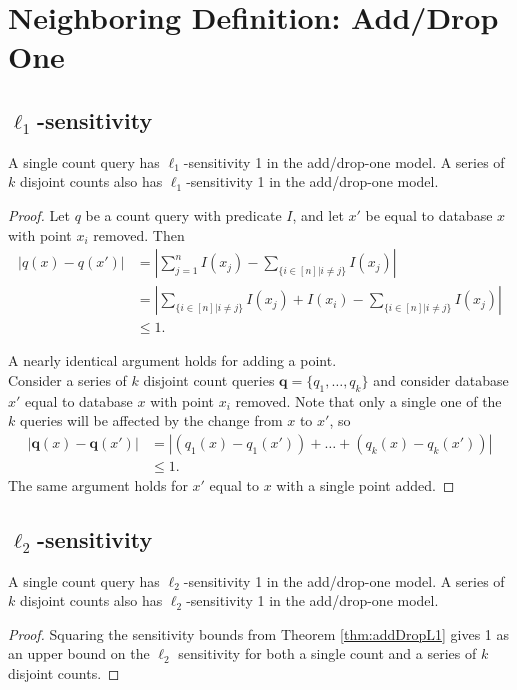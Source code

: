 \documentclass[11pt]{scrartcl} %
\begin{document}
\section{Neighboring Definition: Add/Drop One}
\subsection{$\ell_1$-sensitivity}
\begin{theorem}
\label{thm:addDropL1}
A single count query has $\ell_1$-sensitivity 1 in the add/drop-one model. A series of $k$ disjoint counts also has $\ell_1$-sensitivity 1 in the add/drop-one model.
\end{theorem}

\begin{proof}
Let $q$ be a count query with predicate $I$, and let $x'$ be equal to database $x$ with point $x_i$ removed. Then 
\begin{align*}
\left \vert q(x) - q(x') \right\vert &= \left\vert \sum_{j=1}^n I(x_j) - \sum_{\{ i \in [n] \vert i \ne j\}} I(x_j) \right\vert\\
	&= \left\vert \sum_{\{ i \in [n] \vert i \ne j\}} I(x_j) + I(x_i) - \sum_{\{ i \in [n] \vert i \ne j\}} I(x_j) \right\vert\\
	&\le 1.
\end{align*}

A nearly identical argument holds for adding a point. \\

Consider a series of $k$ disjoint count queries $\mathbf{q} = \{q_1, \ldots, q_k\}$ and consider database $x'$ equal to database $x$ with point $x_i$ removed. Note that only a single one of the $k$ queries will be affected by the change from $x$ to $x'$, so
\begin{align*}
\left\vert \mathbf{q}(x) - \mathbf{q}(x') \right\vert &= \left\vert \left(q_1(x) - q_1(x')\right) + \ldots + \left(q_k(x) - q_k(x')\right) \right\vert \\
	&\le 1.
\end{align*}
The same argument holds for $x'$ equal to $x$ with a single point added.
\end{proof}
\subsection{$\ell_2$-sensitivity}
\begin{theorem}
A single count query has $\ell_2$-sensitivity 1 in the add/drop-one model. A series of $k$ disjoint counts also has $\ell_2$-sensitivity 1 in the add/drop-one model.
\end{theorem}

\begin{proof}
Squaring the sensitivity bounds from Theorem \ref{thm:addDropL1} gives 1 as an upper bound on the $\ell_2$ sensitivity for both a single count and a series of $k$ disjoint counts.
\end{proof}
% 
% 
\end{document}
